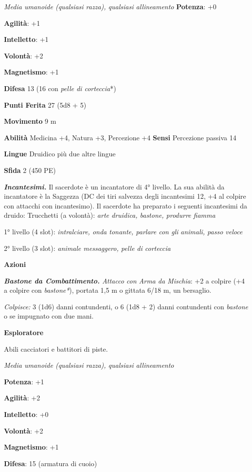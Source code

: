 \begin{multicols}{2}
\emph{Media umanoide (qualsiasi razza), qualsiasi allineamento}
\textbf{Potenza}: +0

\textbf{Agilità}: +1

\textbf{Intelletto}: +1

\textbf{Volontà}: +2

\textbf{Magnetismo}: +1

\textbf{Difesa} 13 (16 con \emph{pelle di corteccia}*)

\textbf{Punti Ferita} 27 (5d8 + 5)

\textbf{Movimento} 9 m

\textbf{Abilità} Medicina +4, Natura +3, Percezione +4 \textbf{Sensi}
Percezione passiva 14

\textbf{Lingue} Druidico più due altre lingue

\textbf{Sfida} 2 (450 PE)

\emph{\textbf{Incantesimi.}} Il sacerdote è un incantatore di 4°
livello. La sua abilità da incantatore è la Saggezza (DC dei tiri
salvezza degli incantesimi 12, +4 al colpire con attacchi con
incantesimo). Il sacerdote ha preparato i seguenti incantesimi da
druido: Trucchetti (a volontà): \emph{arte druidica, bastone, produrre
fiamma}

1° livello (4 slot): \emph{intralciare, onda tonante, parlare con gli}
\emph{animali, passo veloce}

2° livello (3 slot): \emph{animale messaggero, pelle di corteccia}

\textbf{Azioni}

\emph{\textbf{Bastone da Combattimento.} Attacco con Arma da Mischia}:
+2 a colpire (+4 a colpire con \emph{bastone*}), portata 1,5 m o gittata
6/18 m, un bersaglio.

\emph{Colpisce:} 3 (1d6) danni contundenti, o 6 (1d8 + 2) danni
contundenti con \emph{bastone} o se impugnato con due mani.

\textbf{Esploratore}

Abili cacciatori e battitori di piste.

\emph{Media umanoide (qualsiasi razza), qualsiasi allineamento}

\textbf{Potenza}: +1

\textbf{Agilità}: +2

\textbf{Intelletto}: +0

\textbf{Volontà}: +2

\textbf{Magnetismo}: +1

\textbf{Difesa}: 15 (armatura di cuoio)


\end{multicols}
